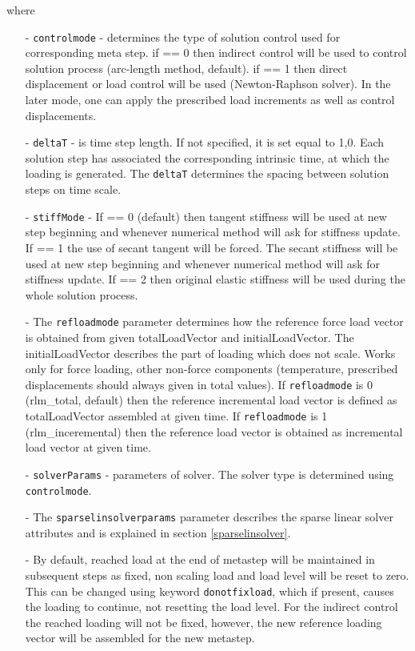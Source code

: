 \documentclass[a4paper]{article}
\newcommand{\param}[1]{\texttt{#1}} %
\begin{document}
where
\begin{itemize}
\item[-] \param{controlmode} - determines the type of solution
control used for corresponding meta step. if == 0 then indirect
control will be used to control solution process (arc-length method, default). if == 1
then direct displacement or load control will be used (Newton-Raphson solver). In the later
mode, one can apply the prescribed load increments as well as
control displacements.
\item[-] \param{deltaT} - is time step length. If not specified, it is
set equal to 1,0. Each solution step has associated the corresponding
intrinsic time, at which the loading is generated. The \param{deltaT}
determines the spacing between solution steps on time scale.
\item[-] \param{stiffMode} - If == 0 (default) then tangent stiffness will be used
at new step beginning and whenever numerical method will ask for
stiffness update. If == 1 the use of secant tangent will be forced.
The secant stiffness will be used at new step beginning
and whenever numerical method will ask for stiffness update.
If == 2 then original elastic stiffness will
be used during the whole solution process.
\item[-] The \param{refloadmode} parameter determines how the reference force load vector
is obtained from given totalLoadVector and initialLoadVector.
The initialLoadVector describes the part of loading which does not scale. Works only for force loading, other non-force components (temperature, prescribed displacements should always given in total values).
If \param{refloadmode} is 0 (rlm\_total, default) then the reference incremental load vector is defined as
totalLoadVector assembled at given time.
If \param{refloadmode} is 1 (rlm\_inceremental) then the reference load vector is
obtained as incremental load vector at given time.
\item[-] \param{solverParams} - parameters of solver. The solver type
is determined using \param{controlmode}.
\item[-] The  \param{sparselinsolverparams} parameter describes the sparse
linear solver attributes and is explained in section
\ref{sparselinsolver}.
\item[-] By default, reached load at the end of
metastep will be maintained in subsequent steps as fixed, non scaling
load and load level will be reset to zero. This can be changed using keyword \param{donotfixload}, which if
present, causes the loading to continue, not resetting the load
level. For the indirect control the reached loading will not be
fixed, however, the new reference loading vector will be assembled for
the new metastep.
\end{itemize}
\end{document}

